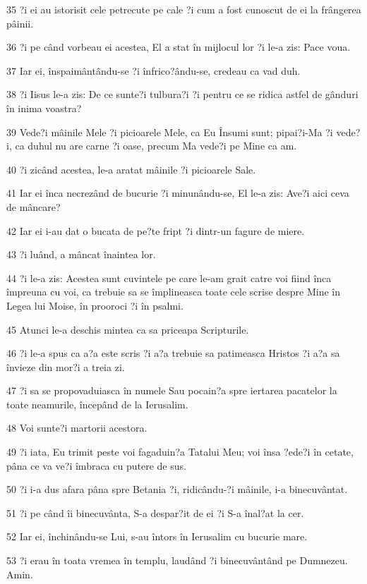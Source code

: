 \par 35 ?i ei au istorisit cele petrecute pe cale ?i cum a fost cunoscut de ei la frângerea pâinii.
\par 36 ?i pe când vorbeau ei acestea, El a stat în mijlocul lor ?i le-a zis: Pace voua.
\par 37 Iar ei, înspaimântându-se ?i înfrico?ându-se, credeau ca vad duh.
\par 38 ?i Iisus le-a zis: De ce sunte?i tulbura?i ?i pentru ce se ridica astfel de gânduri în inima voastra?
\par 39 Vede?i mâinile Mele ?i picioarele Mele, ca Eu Însumi sunt; pipai?i-Ma ?i vede?i, ca duhul nu are carne ?i oase, precum Ma vede?i pe Mine ca am.
\par 40 ?i zicând acestea, le-a aratat mâinile ?i picioarele Sale.
\par 41 Iar ei înca necrezând de bucurie ?i minunându-se, El le-a zis: Ave?i aici ceva de mâncare?
\par 42 Iar ei i-au dat o bucata de pe?te fript ?i dintr-un fagure de miere.
\par 43 ?i luând, a mâncat înaintea lor.
\par 44 ?i le-a zis: Acestea sunt cuvintele pe care le-am grait catre voi fiind înca împreuna cu voi, ca trebuie sa se împlineasca toate cele scrise despre Mine în Legea lui Moise, în prooroci ?i în psalmi.
\par 45 Atunci le-a deschis mintea ca sa priceapa Scripturile.
\par 46 ?i le-a spus ca a?a este scris ?i a?a trebuie sa patimeasca Hristos ?i a?a sa învieze din mor?i a treia zi.
\par 47 ?i sa se propovaduiasca în numele Sau pocain?a spre iertarea pacatelor la toate neamurile, începând de la Ierusalim.
\par 48 Voi sunte?i martorii acestora.
\par 49 ?i iata, Eu trimit peste voi fagaduin?a Tatalui Meu; voi însa ?ede?i în cetate, pâna ce va ve?i îmbraca cu putere de sus.
\par 50 ?i i-a dus afara pâna spre Betania ?i, ridicându-?i mâinile, i-a binecuvântat.
\par 51 ?i pe când îi binecuvânta, S-a despar?it de ei ?i S-a înal?at la cer.
\par 52 Iar ei, închinându-se Lui, s-au întors în Ierusalim cu bucurie mare.
\par 53 ?i erau în toata vremea în templu, laudând ?i binecuvântând pe Dumnezeu. Amin.


